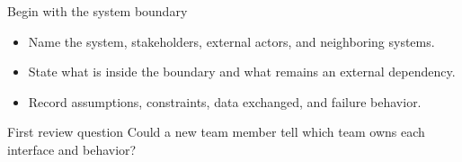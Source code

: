 \begin{frame}{Begin with the system boundary}
\begin{itemize}
  \item Name the system, stakeholders, external actors, and neighboring systems.
  \item State what is inside the boundary and what remains an external dependency.
  \item Record assumptions, constraints, data exchanged, and failure behavior.
\end{itemize}
\begin{slidecallout}{First review question}
Could a new team member tell which team owns each interface and behavior?
\end{slidecallout}
\end{frame}
